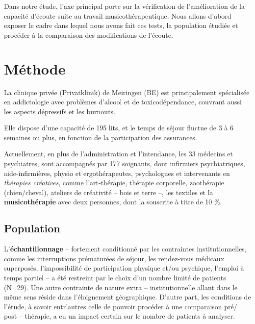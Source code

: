 
Dans notre étude, l'axe principal porte sur la
vérification de l'amélioration de
la capacité d'écoute suite au travail musicothérapeutique.
Nous allons
d'abord exposer le cadre dans lequel nous avons fait ces tests, la
population étudiée et procéder à la comparaison des modifications de
l'écoute.

\section{Méthode}

 La clinique privée (Privatklinik)
de Meiringen (BE) est  principalement spécialisée en
addictologie avec problèmes d'alcool et de toxicodépendance, couvrant aussi les aspects dépressifs
et les
burnouts.


Elle dispose d'une capacité de 195 lits, et le temps de séjour fluctue de 3 à 6 semaines ou plus, en
fonction de la participation des assurances.

Actuellement, en plus de l'administration et l'intendance, les 33
médecins et psychiatres, sont
accompagnés par 177
soignants, dont infirmiers psychiatriques, aide-infirmières, physio et
ergothérapeutes,
psychologues et intervenants en \textit{thérapies
créatives}, comme l'art-thérapie, thérapie
corporelle, zoothérapie (chien/cheval),  ateliers de créativité --
bois et terre --,  les textiles et la\textbf{ musicothérapie} avec deux
personnes, dont la souscrite à titre de 10 \%.








\subsection{Population}
L'\textbf{échantillonnage} -- fortement conditionné par les contraintes
institutionnelles, comme les interruptions prématurées de séjour, les rendez-vous
 médicaux superposés, l'impossibilité de participation physique et/ou
 psychique,
 l'emploi à
 temps partiel -- a été restreint  par le choix d'un nombre limité de
 patients (N=29).
Une autre contrainte de nature extra -- institutionnelle allant dans le
même sens réside dans l'éloignement géographique.
D'autre part, les conditions de l'étude,
à savoir entr'autres celle de pouvoir procéder à une comparaison pré/ post -- thérapie, a eu un impact certain sur le nombre de patients à analyser.


